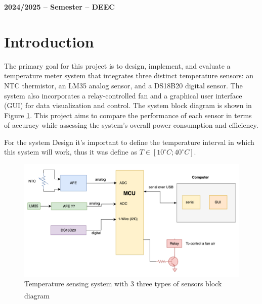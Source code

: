 \documentclass[12pt]{article}
\begin{document}

\vspace{6cm}

\begin{center}
    \large \bf 2024/2025 --  Semester -- DEEC
\end{center}

\thispagestyle{empty}

\setcounter{page}{0}

\newpage

\newpage

\tableofcontents %

\newpage

\listoffigures

\newpage

\section{Introduction}


    The primary goal for this project is to design, implement, and evaluate a temperature meter system that integrates three distinct temperature sensors: an NTC thermistor, an LM35 analog sensor, and a DS18B20 digital sensor. The system also incorporates a relay-controlled fan and a graphical  user interface (GUI) for data visualization and control. The system block diagram is shown in Figure \ref{fig:design-system}. This project aims to compare the performance of each sensor in terms of accuracy while assessing the system's overall power consumption and efficiency.


    \label{requirements}
    For the system Design it's important to define the temperature interval in which this system will work, thus it was define as $ T \in [10^\circ C; 40^\circ C]$. 

   \begin{figure}[H] 
        \centering
        \includegraphics*[scale = 0.5]{images/system-design.png}
        \caption{Temperature sensing system with 3 three types of sensors block diagram\textsuperscript{\cite{lab_statement}}}
        \label{fig:design-system}
    \end{figure}
\end{document}
